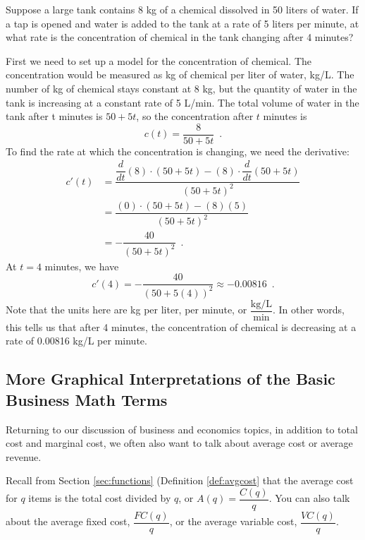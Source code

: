 \begin{example}
Suppose a large tank contains 8 kg of a chemical dissolved in 50 liters of water. If a tap is opened and water is added to the tank at a rate of 5 liters per minute, at what rate is the concentration of chemical in the tank changing after 4 minutes?

\begin{solution} First we need to set up a model for the concentration of chemical. The concentration would be measured as kg of chemical per liter of water, kg/L. The number of kg of chemical stays constant at 8 kg, but the quantity of water in the tank is increasing at a constant rate of 5 L/min. The total volume of water in the tank after t minutes is $50+5t$, so the concentration after $t$ minutes is
$$c(t)=\dfrac{8}{50+5t} \enspace .$$
To find the rate at which the concentration is changing, we need the derivative:
\begin{align*}
			c'(t) &= \dfrac{\dfrac{d}{dt}(8)\cdot(50+5t)-(8)\cdot\dfrac{d}{dt}(50+5t)}{(50+5t)^2} \\
			 &= \dfrac{(0)\cdot(50+5t)-(8)(5)}{(50+5t)^2} \\
			 &= -\dfrac{40}{(50+5t)^2} \enspace .
		\end{align*}
At $t=4$ minutes, we have 
$$ c'(4)=-\dfrac{40}{(50+5(4))^2}\approx -0.00816 \enspace .$$
Note that the units here are kg per liter, per minute, or $ \dfrac{\text{kg/L}}{\text{min}} $. In other words, this tells us that after 4 minutes, the concentration of chemical is decreasing at a rate of 0.00816 kg/L per minute.
\end{solution}\end{example}

\subsection{More Graphical Interpretations of the Basic Business Math Terms}
Returning to our discussion of business and economics topics, in addition to total cost and marginal cost, we often also want to talk about average cost or average revenue.

Recall from Section \ref{sec:functions} (Definition \ref{def:avgcost} that the average cost for $q$ items is the total cost divided by $q$, or $A(q)=\dfrac{C(q)}{q}$. You can also talk about the average fixed cost, $\dfrac{FC(q)}{q}$, or the average variable cost, $\dfrac{VC(q)}{q}$.

